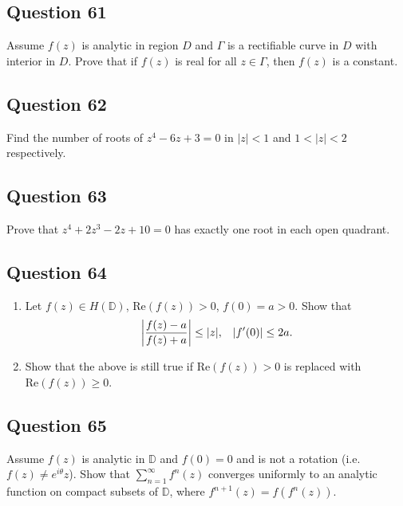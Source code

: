 \documentclass[12pt]{article}
\begin{document}
\hypertarget{question-61-2}{%
\subsection{Question 61}\label{question-61-2}}

Assume \(f(z)\) is analytic in region \(D\) and \(\Gamma\) is a
rectifiable curve in \(D\) with interior in \(D\). Prove that if
\(f(z)\) is real for all \(z \in \Gamma\), then \(f(z)\) is a constant.

\hypertarget{question-62-2}{%
\subsection{Question 62}\label{question-62-2}}

Find the number of roots of \(z^4 - 6z + 3 =0\) in \(|z|<1\) and
\(1 < |z| < 2\) respectively.

\hypertarget{question-63-2}{%
\subsection{Question 63}\label{question-63-2}}

Prove that \(z^4 + 2 z^3 - 2z + 10 =0\) has exactly one root in each
open quadrant.

\hypertarget{question-64-2}{%
\subsection{Question 64}\label{question-64-2}}

\begin{enumerate}
\def\labelenumi{(\arabic{enumi})}
\item
  Let \(f(z) \in H({\mathbb D})\), \(\text{Re}(f(z)) >0\),
  \(f(0)= a>0\). Show that
  \[{\left\lvert { \frac{f(z)-a}{f(z)+a}} \right\rvert} \leq |z|, \; \; \;
  |f'(0)| \leq 2a.\]
\item
  Show that the above is still true if \(\text{Re}(f(z)) >0\) is
  replaced with \(\text{Re}(f(z)) \geq 0\).
\end{enumerate}

\hypertarget{question-65-2}{%
\subsection{Question 65}\label{question-65-2}}

Assume \(f(z)\) is analytic in \({\mathbb D}\) and \(f(0)=0\) and is not
a rotation (i.e.~\(f(z) \neq e^{i \theta} z\)). Show that
\(\displaystyle \sum_{n=1}^\infty f^{n}(z)\) converges uniformly to an
analytic function on compact subsets of \({\mathbb D}\), where
\(f^{n+1}(z) = f(f^{n}(z))\).
\end{document}
